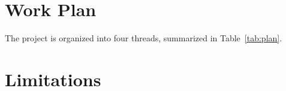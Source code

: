 \documentclass[11pt]{article}
\begin{document}

\section{Work Plan}\label{sec:plan}

The project is organized into four threads, summarized in Table~\ref{tab:plan}.


\section*{Limitations}
\end{document}
